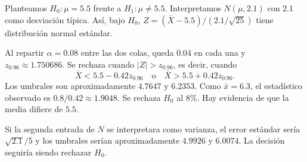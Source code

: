 Planteamos $H_0:\mu=5.5$ frente a $H_1:\mu\ne5.5$.
Interpretamos $N(\mu,2.1)$ con $2.1$ como desviación típica.
Así, bajo $H_0$, $Z=(\bar X-5.5)/(2.1/\sqrt{25})$
tiene distribución normal estándar.

Al repartir $\alpha=0.08$ entre las dos colas, queda $0.04$
en cada una y $z_{0.96}\approx1.750686$. Se rechaza cuando
$|Z|>z_{0.96}$, es decir, cuando
\[
\bar X<5.5-0.42z_{0.96}\quad\text{o}\quad
\bar X>5.5+0.42z_{0.96}.
\]
Los umbrales son aproximadamente $4.7647$ y $6.2353$.
Como $\bar x=6.3$, el estadístico observado es $0.8/0.42\approx1.9048$.
Se rechaza $H_0$ al $8\%$. Hay evidencia de que la media difiere de $5.5$.

Si la segunda entrada de $N$ se interpretara como varianza,
el error estándar sería $\sqrt{2.1}/5$ y los umbrales serían
aproximadamente $4.9926$ y $6.0074$. La decisión seguiría
siendo rechazar $H_0$.
